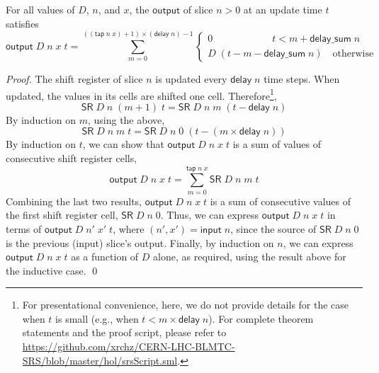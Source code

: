 \documentclass{llncs}
\begin{document}
\begin{theorem}\label{output_input_at_update_times}
For all values of $D$, $n$, and $x$, the $\mathsf{output}$ of slice $n>0$ at an update time $t$ satisfies
\begin{equation*}
\mathsf{output}\;D\;n\;x\;t=\sum_{m=0}^{((\mathsf{tap}\;n\;x)+1)\times(\mathsf{delay}\;n)-1}\begin{cases}0 \qquad\qquad\qquad  t<m+\mathsf{delay\_sum}\;n\\D\;(t-m-\mathsf{delay\_sum}\;n)\quad\text{otherwise}\end{cases}
\end{equation*}
\end{theorem}

\begin{proof}
The shift register of slice $n$ is updated every $\mathsf{delay}\;n$ time steps.
When updated, the values in its cells are shifted one cell.
Therefore\footnote{For presentational convenience, here, we do not provide details for the case when $t$ is small (e.g., when $t<m\times\mathsf{delay}\;n$).
For complete theorem statements and the proof script, please refer to {\scriptsize \url{https://github.com/xrchz/CERN-LHC-BLMTC-SRS/blob/master/hol/srsScript.sml}.}},
\begin{equation*}
\mathsf{SR}\;D\;n\;(m+1)\;t=\mathsf{SR}\;D\;n\;m\;(t-\mathsf{delay}\;n)
\end{equation*}
By induction on $m$, using the above,
\begin{equation*}
\mathsf{SR}\;D\;n\;m\;t=\mathsf{SR}\;D\;n\;0\;(t-(m\times\mathsf{delay}\;n))
\end{equation*}
By induction on $t$, we can show that $\mathsf{output}\;D\;n\;x\;t$ is a sum of values of consecutive shift register cells,
\begin{equation*}
\mathsf{output}\;D\;n\;x\;t=\sum_{m=0}^{\mathsf{tap}\;n\;x}\mathsf{SR}\;D\;n\;m\;t
\end{equation*}
Combining the last two results, $\mathsf{output}\;D\;n\;x\;t$ is a sum of consecutive values of the first shift register cell, $\mathsf{SR}\;D\;n\;0$.
Thus, we can express $\mathsf{output}\;D\;n\;x\;t$ in terms of $\mathsf{output}\;D\;n'\;x'\;t$, where $(n',x')=\mathsf{input}\;n$, since the source of $\mathsf{SR}\;D\;n\;0$ is the previous (input) slice's output.
Finally, by induction on $n$, we can express $\mathsf{output}\;D\;n\;x\;t$ as a function of $D$ alone, as required, using the result above for the inductive case.
\qed
\end{proof}
\end{document}
